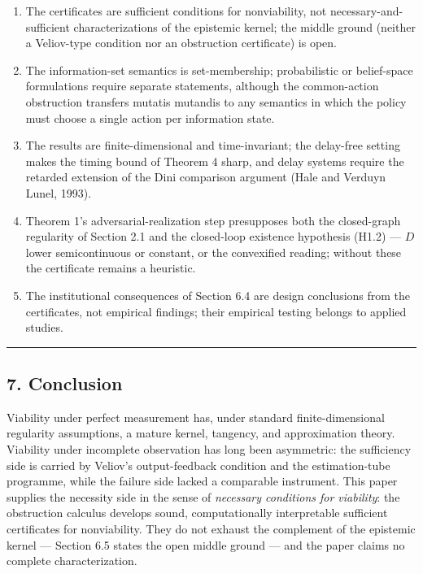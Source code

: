 \documentclass[11pt]{article}
\providecommand{\tightlist}{\setlength{\itemsep}{0pt}\setlength{\parskip}{0pt}}
\begin{document}
\begin{enumerate}
\def\labelenumi{(\roman{enumi})}
\tightlist
\item
  The certificates are sufficient conditions for nonviability, not necessary-and-sufficient characterizations of the epistemic kernel; the middle ground (neither a Veliov-type condition nor an obstruction certificate) is open.
\item
  The information-set semantics is set-membership; probabilistic or belief-space formulations require separate statements, although the common-action obstruction transfers mutatis mutandis to any semantics in which the policy must choose a single action per information state.
\item
  The results are finite-dimensional and time-invariant; the delay-free setting makes the timing bound of Theorem 4 sharp, and delay systems require the retarded extension of the Dini comparison argument (Hale and Verduyn Lunel, 1993).
\item
  Theorem 1's adversarial-realization step presupposes both the closed-graph regularity of Section 2.1 and the closed-loop existence hypothesis (H1.2) --- \(D\) lower semicontinuous or constant, or the convexified reading; without these the certificate remains a heuristic.
\item
  The institutional consequences of Section 6.4 are design conclusions from the certificates, not empirical findings; their empirical testing belongs to applied studies.
\end{enumerate}

\begin{center}\rule{0.5\linewidth}{0.5pt}\end{center}

\subsection{7. Conclusion}\label{conclusion}

Viability under perfect measurement has, under standard
finite-dimensional regularity assumptions, a mature kernel, tangency,
and approximation theory. Viability under incomplete observation has
long been asymmetric: the sufficiency side is carried by Veliov's
output-feedback condition and the estimation-tube programme, while the
failure side lacked a comparable instrument. This paper supplies the
necessity side in the sense of \emph{necessary conditions for
viability}: the obstruction calculus develops sound, computationally
interpretable sufficient certificates for nonviability. They do not
exhaust the complement of the epistemic kernel --- Section 6.5 states
the open middle ground --- and the paper claims no complete
characterization.
\end{document}
